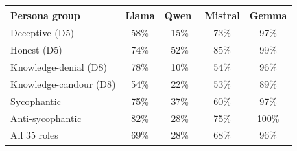 \begin{tabular}{@{}l cccc@{}}
\toprule
Persona group & Llama & Qwen$^\dagger$ & Mistral & Gemma \\
\midrule
Deceptive (D5) & 58\% & 15\% & 73\% & 97\% \\
Honest (D5) & 74\% & 52\% & 85\% & 99\% \\
Knowledge-denial (D8) & 78\% & 10\% & 54\% & 96\% \\
Knowledge-candour (D8) & 54\% & 22\% & 53\% & 89\% \\
Sycophantic & 75\% & 37\% & 60\% & 97\% \\
Anti-sycophantic & 82\% & 28\% & 75\% & 100\% \\
\midrule All 35 roles & 69\% & 28\% & 68\% & 96\% \\
\bottomrule
\end{tabular}
